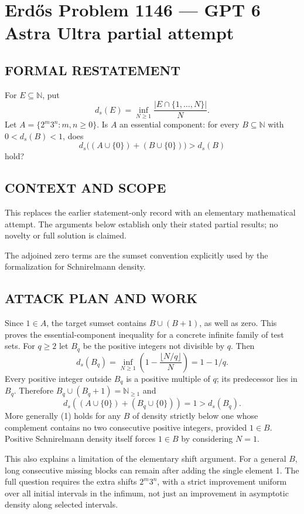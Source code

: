 \section*{Erd\H{o}s Problem 1146 --- GPT 6 Astra Ultra partial attempt}


\subsection*{FORMAL RESTATEMENT}
For $E\subseteq\mathbb N$, put
\[
d_s(E)=\inf_{N\geq1}\frac{|E\cap\{1,\ldots,N\}|}{N}.
\]
Let $A=\{2^m3^n:m,n\geq0\}$. Is $A$ an essential component: for every $B\subseteq\mathbb N$ with $0<d_s(B)<1$, does
\[
d_s\bigl((A\cup\{0\})+(B\cup\{0\})\bigr)>d_s(B)
\]
hold?

\subsection*{CONTEXT AND SCOPE}
This replaces the earlier statement-only record with an elementary mathematical attempt. The arguments below establish only their stated partial results; no novelty or full solution is claimed.

The adjoined zero terms are the sumset convention explicitly used by the formalization for Schnirelmann density.

\subsection*{ATTACK PLAN AND WORK}
Since $1\in A$, the target sumset contains $B\cup(B+1)$, as well as zero.
This proves the essential-component inequality for a concrete infinite family
of test sets. For $q\ge2$ let $B_q$ be the positive integers not divisible by $q$.
Then
\[d_s(B_q)=\inf_{N\ge1}\left(1-\frac{\lfloor N/q\rfloor}{N}\right)=1-1/q.\]
Every positive integer outside $B_q$ is a positive multiple of $q$; its predecessor
lies in $B_q$. Therefore $B_q\cup(B_q+1)=\mathbb N_{\ge1}$ and
\[d_s((A\cup\{0\})+(B_q\cup\{0\}))=1>d_s(B_q).\tag{1}\]
More generally (1) holds for any $B$ of density strictly below one whose complement
contains no two consecutive positive integers, provided $1\in B$.
Positive Schnirelmann density itself forces $1\in B$ by considering $N=1$.

This also explains a limitation of the elementary shift argument. For a general
$B$, long consecutive missing blocks can remain after adding the single element
1. The full question requires the extra shifts $2^m3^n$, with a strict improvement
uniform over all initial intervals in the infimum, not just an improvement in
asymptotic density along selected intervals.

